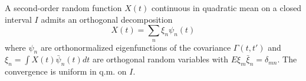 A second-order random function $X(t)$ continuous in quadratic mean on a closed interval $I$ admits an orthogonal decomposition $$X(t) = \sum_n \xi_n \psi_n(t)$$ where $\psi_n$ are orthonormalized eigenfunctions of the covariance $\Gamma(t, t')$ and $\xi_n = \int X(t) \bar{\psi}_n(t) dt$ are orthogonal random variables with $E\xi_m \bar{\xi}_n = \delta_{mn}$. The convergence is uniform in q.m. on $I$.
